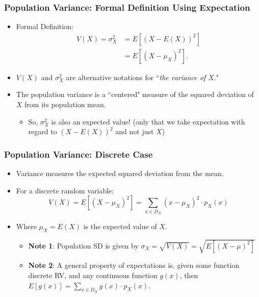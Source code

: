 \documentclass[handout]{beamer} %
\begin{document}
\begin{frame} %
\frametitle{Population Variance: Formal Definition Using Expectation}
\begin{itemize}
  \item Formal Definition:
  \pause
  \begin{align*}
      V(X) = \sigma_X^2 &=  E[(X - E(X))^2]  \\
                        &=  E[(X - \mu_X)^2].
  \end{align*} \vspace{-1em}
  \pause
\item $V(X)$ and $\sigma_X^2$ are alternative notations for ``\emph{the variance of $X$}."   \pause
\item The population variance is a ``centered" measure of the squared deviation of $X$ from its population mean.    \pause
\begin{itemize}
    \item So, $\sigma_X^2$ is also an expected value! (only that we take expectation with regard to $(X - E(X))^2$ and not just $X$)
\end{itemize}

\end{itemize}
\end{frame}

\begin{frame}
\frametitle{Population Variance: Discrete Case}

\begin{itemize}
  \item Variance measures the expected squared deviation from the mean.
  \item For a discrete random variable:
  \[
  V(X) =  E[(X - \mu_X)^2] =  \sum_{x \in D_X} (x - \mu_X)^2 \cdot p_X(x)
  \]
  \item Where $\mu_X = E(X)$ is the expected value of $X$.
  \begin{itemize}
      \item \textbf{Note 1}: Population SD is given by $\sigma_X = \sqrt{V(X)} = \sqrt{E[(X-\mu)^2]} $
      \item \textbf{Note 2}: A general property of expectations is, given some function discrete RV, and any continuous function $g(x)$, then $E[g(x)] = \sum_{x \in D_X} g(x) \cdot p_X(x)$.
  \end{itemize}
\end{itemize}

\end{frame}
\end{document}
